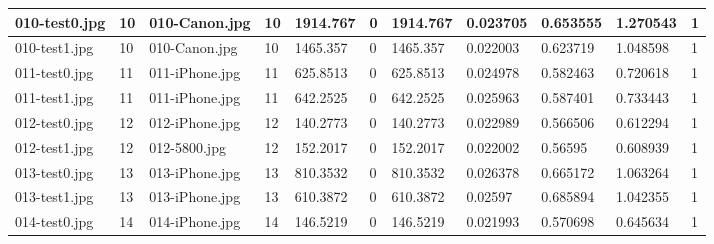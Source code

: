 \begin{landscape}
\begin{longtable}{|p{2cm}|p{1cm}|p{2cm}|p{1cm}|p{2cm}|p{1cm}|p{2cm}|p{2cm}|p{2cm}|p{2cm}|p{1cm}|}
		010-test0.jpg   & 10               & 010-Canon.jpg         & 10                          & 1914.767              & 0                       & 1914.767                   & 0.023705              & 0.653555              & 1.270543                 & 1                \\ \hline
		010-test1.jpg   & 10               & 010-Canon.jpg         & 10                          & 1465.357              & 0                       & 1465.357                   & 0.022003              & 0.623719              & 1.048598                 & 1                \\ \hline
		011-test0.jpg   & 11               & 011-iPhone.jpg        & 11                          & 625.8513              & 0                       & 625.8513                   & 0.024978              & 0.582463              & 0.720618                 & 1                \\ \hline
		011-test1.jpg   & 11               & 011-iPhone.jpg        & 11                          & 642.2525              & 0                       & 642.2525                   & 0.025963              & 0.587401              & 0.733443                 & 1                \\ \hline
		012-test0.jpg   & 12               & 012-iPhone.jpg        & 12                          & 140.2773              & 0                       & 140.2773                   & 0.022989              & 0.566506              & 0.612294                 & 1                \\ \hline
		012-test1.jpg   & 12               & 012-5800.jpg          & 12                          & 152.2017              & 0                       & 152.2017                   & 0.022002              & 0.56595               & 0.608939                 & 1                \\ \hline
		013-test0.jpg   & 13               & 013-iPhone.jpg        & 13                          & 810.3532              & 0                       & 810.3532                   & 0.026378              & 0.665172              & 1.063264                 & 1                \\ \hline
		013-test1.jpg   & 13               & 013-iPhone.jpg        & 13                          & 610.3872              & 0                       & 610.3872                   & 0.02597               & 0.685894              & 1.042355                 & 1                \\ \hline
		014-test0.jpg   & 14               & 014-iPhone.jpg        & 14                          & 146.5219              & 0                       & 146.5219                   & 0.021993              & 0.570698              & 0.645634                 & 1                \\ \hline

\end{longtable}
\end{landscape}
